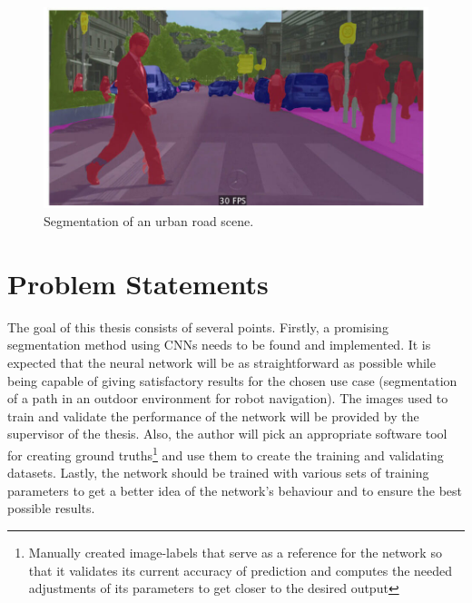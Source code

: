 \vspace{5mm}
\begin{figure}[htb]
	\begin{center}
		\includegraphics*[width=13cm, keepaspectratio]{obr/semseg.jpg}
	\end{center}
	\caption{Segmentation of an urban road scene. \cite{sergios}} 
	\label{segment}
\end{figure}

\chapter{Problem Statements}
The goal of this thesis consists of several points. Firstly, a promising segmentation method using CNNs needs to be found and implemented. It is expected that the neural network will be as straightforward as possible while being capable of giving satisfactory results for the chosen use case (segmentation of a path in an outdoor environment for robot navigation). The images used to train and validate the performance of the network will be provided by the supervisor of the thesis. Also, the author will pick an appropriate software tool for creating ground truths\footnote{Manually created image-labels that serve as a reference for the network so that it validates its current accuracy of prediction and computes the needed adjustments of its parameters to get closer to the desired output} and use them to create the training and validating datasets. Lastly, the network should be trained with various sets of training parameters to get a better idea of the network's behaviour and to ensure the best possible results. 

